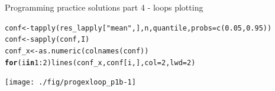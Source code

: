 \documentclass[xcolor=table,           xcolor=dvipsnames]{beamer}\usepackage[]{graphicx}\usepackage[]{color}
\makeatletter
\newcommand{\hlnum}[1]{\textcolor[rgb]{0,0,0}{#1}}
\newcommand{\hlstr}[1]{\textcolor[rgb]{0.545,0.137,0.137}{#1}}
\newcommand{\hlopt}[1]{\textcolor[rgb]{0,0,0}{#1}}
\newcommand{\hlstd}[1]{\textcolor[rgb]{0,0,0}{#1}}
\newcommand{\hlkwa}[1]{\textcolor[rgb]{1,0,0}{\textbf{#1}}}
\newcommand{\hlkwb}[1]{\textcolor[rgb]{0,0,0}{#1}}
\newcommand{\hlkwc}[1]{\textcolor[rgb]{1,0,1}{#1}}
\newcommand{\hlkwd}[1]{\textcolor[rgb]{0,0,1}{#1}}
\newenvironment{kframe}{%
 \def\at@end@of@kframe{}%
 \ifinner\ifhmode%
  \def\at@end@of@kframe{\end{minipage}}%
  \begin{minipage}{\columnwidth}%
 \fi\fi%
 \def\FrameCommand##1{\hskip\@totalleftmargin \hskip-\fboxsep
 \colorbox{shadecolor}{##1}\hskip-\fboxsep
     \hskip-\linewidth \hskip-\@totalleftmargin \hskip\columnwidth}%
 \MakeFramed {\advance\hsize-\width
   \@totalleftmargin\z@ \linewidth\hsize
   \@setminipage}}%
 {\par\unskip\endMakeFramed%
 \at@end@of@kframe}
\newenvironment{knitrout}{}{} %
\makeatother
\begin{document}

\begin{frame}[fragile]{Programming practice solutions part 4 - loops plotting}
\vspace{-0.17em}
\begin{knitrout}\footnotesize
{}\color{fgcolor}\begin{kframe}
\begin{alltt}
\hlstd{conf} \hlkwb{<-} \hlkwd{tapply}\hlstd{(res_lapply[}\hlstr{"mean"}\hlstd{, ], n, quantile,} \hlkwc{probs}\hlstd{=}\hlkwd{c}\hlstd{(}\hlnum{0.05}\hlstd{,} \hlnum{0.95}\hlstd{))}
\hlstd{conf} \hlkwb{<-} \hlkwd{sapply}\hlstd{(conf, I)}
\hlstd{conf_x} \hlkwb{<-} \hlkwd{as.numeric}\hlstd{(}\hlkwd{colnames}\hlstd{(conf))}
\hlkwa{for}\hlstd{(i} \hlkwa{in} \hlnum{1}\hlopt{:}\hlnum{2}\hlstd{)} \hlkwd{lines}\hlstd{(conf_x, conf[i, ],} \hlkwc{col}\hlstd{=}\hlnum{2}\hlstd{,} \hlkwc{lwd}\hlstd{=}\hlnum{2}\hlstd{)}
\end{alltt}
\end{kframe}

{\centering \texttt{[image: ./fig/progexloop\_p1b-1]} 

}



\end{knitrout}
\end{frame}

\end{document}
